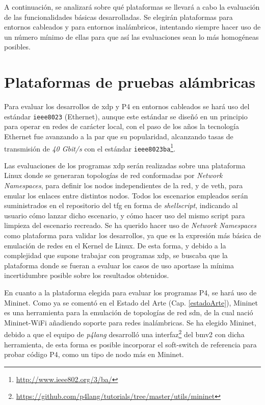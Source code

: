 A continuación, se analizará sobre qué plataformas se llevará a cabo la evaluación de las funcionalidades básicas desarrolladas. Se elegirán plataformas para entornos cableados y para entornos  inalámbricos, intentando siempre hacer uso de un número mínimo de ellas para que así las evaluaciones sean lo más homogéneas posibles. 


\section{Plataformas de pruebas alámbricas}

Para evaluar los desarrollos de \gls{xdp} y P4 en entornos  cableados se hará uso del estándar \texttt{ieee8023} (Ethernet), aunque este estándar se diseñó en un principio para operar en redes de carácter local, con el paso de los años la tecnología Ethernet fue avanzando a la par que su popularidad, alcanzando tasas de transmisión de \textit{40 Gbit/s} con el estándar \texttt{ieee8023ba}\footnote{\url{http://www.ieee802.org/3/ba/}}. \\
\par

 Las evaluaciones de los programas \gls{xdp} serán realizadas sobre una plataforma Linux donde se generaran topologías de red conformadas por \textit{Network Namespaces}, para definir los nodos independientes de la red, y de \gls{veth}, para emular los enlaces entre distintos nodos. Todos los escenarios empleados serán suministrados en el repositorio del \gls{tfg} en forma de \textit{shellscript}, indicando al usuario cómo lanzar dicho escenario, y cómo hacer uso del mismo script para limpieza del escenario recreado. Se ha querido hacer uso de \textit{Network Namespaces} como plataforma para validar los desarrollos, ya que es la expresión más básica de emulación de redes en el Kernel de Linux. De esta forma, y debido a la complejidad que supone trabajar con programas \gls{xdp}, se buscaba que la plataforma donde se fueran a evaluar los casos de uso aportase la mínima incertidumbre posible sobre los resultados obtenidos. \\

\par

En cuanto a la plataforma elegida para evaluar los programas P4, se hará uso de Mininet. Como ya se comentó en el Estado del Arte (Cap. \ref{estadoArte}), Mininet es una herramienta para la emulación de topologías de red \gls{sdn}, de la cual nació Mininet-WiFi añadiendo soporte para redes inalámbricas. Se ha elegido Mininet, debido a que el equipo de \textit{p4lang} desarrolló una interfaz\footnote{\url{https://github.com/p4lang/tutorials/tree/master/utils/mininet}} del \gls{bmv2} con dicha herramienta, de esta forma es posible incorporar el soft-switch de referencia para probar código P4, como un tipo de nodo más en Mininet. 
 


